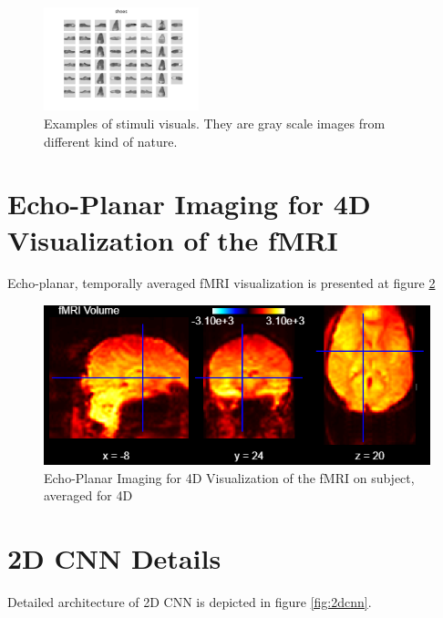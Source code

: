 \documentclass[10pt, twocolumn, letterpaper]{article}
\begin{document}
\begin{figure}
    \includegraphics[width=.33\linewidth, height=3cm,  valign=c]{images/shoes.png}
    \caption{Examples of stimuli visuals. They are gray scale images from different kind of nature.
}\label{fig:stimuli}
\end{figure}


\section{Echo-Planar Imaging for 4D Visualization of the fMRI}
\label{appendix:B}
Echo-planar, temporally averaged fMRI visualization is presented at figure \ref{fig:epi}
\begin{figure}
\begin{center}
 \includegraphics[width=1\linewidth]{images/indir.png}
\end{center}
   \caption{Echo-Planar Imaging for 4D Visualization of the fMRI on subject, averaged for 4D}
\label{fig:epi}
\end{figure}


\section{2D CNN Details}
\label{appendix:C}
Detailed architecture of 2D CNN is depicted in figure \ref{fig:2dcnn}.
\end{document}
